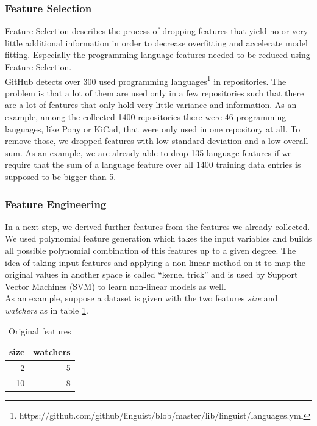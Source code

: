 \documentclass[%
a4paper,
DIV12,
2.5headlines,
bigheadings,
titlepage,
openbib,
]{scrartcl}
\begin{document}
\subsubsection{Feature Selection}\label{feature-selection}

Feature Selection describes the process of dropping features that yield no or very little additional information in order to decrease overfitting and accelerate model fitting.
Especially the programming language features needed to be reduced using Feature Selection.\\
GitHub detects over 300 used programming languages\footnote{https://github.com/github/linguist/blob/master/lib/linguist/languages.yml} in repositories.
The problem is that a lot of them are used only in a few repositories such that there are a lot of features that only hold very little variance and information.
As an example, among the collected 1400 repositories there were 46 programming languages, like Pony or KiCad, that were only used in one repository at all.
To remove those, we dropped features with low standard deviation and a low overall sum.
As an example, we are already able to drop 135 language features if we require that the sum of a language feature over all 1400 training data entries is supposed to be bigger than 5.

\subsubsection{Feature Engineering}\label{feature-engineering}

In a next step, we derived further features from the features we already collected.
We used polynomial feature generation which takes the input variables and builds all possible polynomial combination of this features up to a given degree.
The idea of taking input features and applying a non-linear method on it to map the original values in another space is called ``kernel trick'' and is used by Support Vector Machines (SVM) to learn non-linear models as well.\\
As an example, suppose a dataset is given with the two features \textit{size} and \textit{watchers} as in table \ref{example-feature-engineering-basic}.

\begin{table}[]
\label{example-feature-engineering-basic}
\centering
\caption{Original features}
\begin{tabular}{|r|r|}
\hline
size & watchers \\ \hline
2    & 5        \\ \hline
10   & 8        \\ \hline
\end{tabular}
\end{table}
\end{document}

